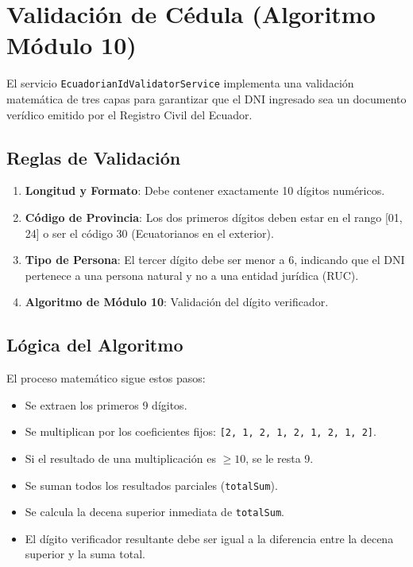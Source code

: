\documentclass[a4paper,12pt]{article}
\begin{document}
    \section{Validación de Cédula (Algoritmo Módulo 10)}

    El servicio \texttt{EcuadorianIdValidatorService} implementa una validación matemática de tres capas para garantizar que el DNI ingresado sea un documento verídico emitido por el Registro Civil del Ecuador.

    \subsection{Reglas de Validación}

    \begin{enumerate}
        \item \textbf{Longitud y Formato}: Debe contener exactamente 10 dígitos numéricos.
        \item \textbf{Código de Provincia}: Los dos primeros dígitos deben estar en el rango [01, 24] o ser el código 30 (Ecuatorianos en el exterior).
        \item \textbf{Tipo de Persona}: El tercer dígito debe ser menor a 6, indicando que el DNI pertenece a una persona natural y no a una entidad jurídica (RUC).
        \item \textbf{Algoritmo de Módulo 10}: Validación del dígito verificador.
    \end{enumerate}

    \subsection{Lógica del Algoritmo}

    El proceso matemático sigue estos pasos:
    \begin{itemize}
        \item Se extraen los primeros 9 dígitos.
        \item Se multiplican por los coeficientes fijos: \texttt{[2, 1, 2, 1, 2, 1, 2, 1, 2]}.
        \item Si el resultado de una multiplicación es $\ge 10$, se le resta 9.
        \item Se suman todos los resultados parciales (\texttt{totalSum}).
        \item Se calcula la decena superior inmediata de \texttt{totalSum}.
        \item El dígito verificador resultante debe ser igual a la diferencia entre la decena superior y la suma total.
    \end{itemize}
\end{document}
